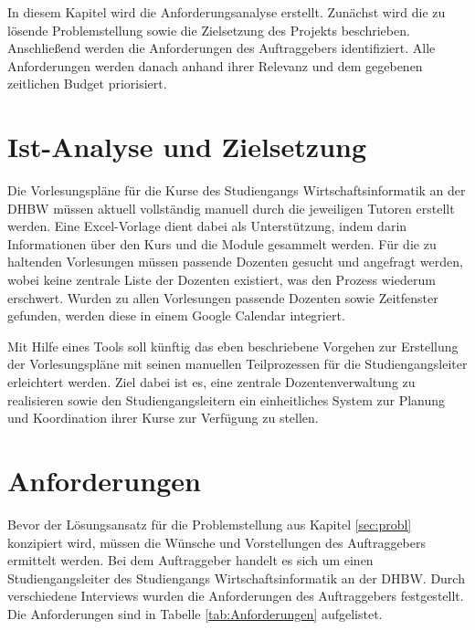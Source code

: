 In diesem Kapitel wird die Anforderungsanalyse erstellt.
Zunächst wird die zu lösende Problemstellung sowie die Zielsetzung des Projekts beschrieben.
Anschließend werden die Anforderungen des Auftraggebers identifiziert.
Alle Anforderungen werden danach anhand ihrer Relevanz und dem gegebenen zeitlichen Budget priorisiert.


\section{Ist-Analyse und Zielsetzung}\label{sec:probl}

Die Vorlesungspläne für die Kurse des Studiengangs Wirtschaftsinformatik an der \ac{DHBW} müssen aktuell vollständig manuell durch die jeweiligen Tutoren erstellt werden.
Eine Excel-Vorlage dient dabei als Unterstützung, indem darin Informationen über den Kurs und die Module gesammelt werden.
Für die zu haltenden Vorlesungen müssen passende Dozenten gesucht und angefragt werden, wobei keine zentrale Liste der Dozenten existiert, was den Prozess wiederum erschwert.
Wurden zu allen Vorlesungen passende Dozenten sowie Zeitfenster gefunden, werden diese in einem Google Calendar integriert.

Mit Hilfe eines Tools soll künftig das eben beschriebene Vorgehen zur Erstellung der Vorlesungspläne mit seinen manuellen Teilprozessen für die Studiengangsleiter erleichtert werden.
Ziel dabei ist es, eine zentrale Dozentenverwaltung zu realisieren sowie den Studiengangsleitern ein einheitliches System zur Planung und Koordination ihrer Kurse zur Verfügung zu stellen.


\section{Anforderungen}

Bevor der Lösungsansatz für die Problemstellung aus Kapitel \vref{sec:probl} konzipiert wird, müssen die Wünsche und Vorstellungen des Auftraggebers ermittelt werden.
Bei dem Auftraggeber handelt es sich um einen Studiengangsleiter des Studiengangs Wirtschaftsinformatik an der \ac{DHBW}.
Durch verschiedene Interviews wurden die Anforderungen des Auftraggebers festgestellt.
Die Anforderungen sind in Tabelle \ref{tab:Anforderungen} aufgelistet.

